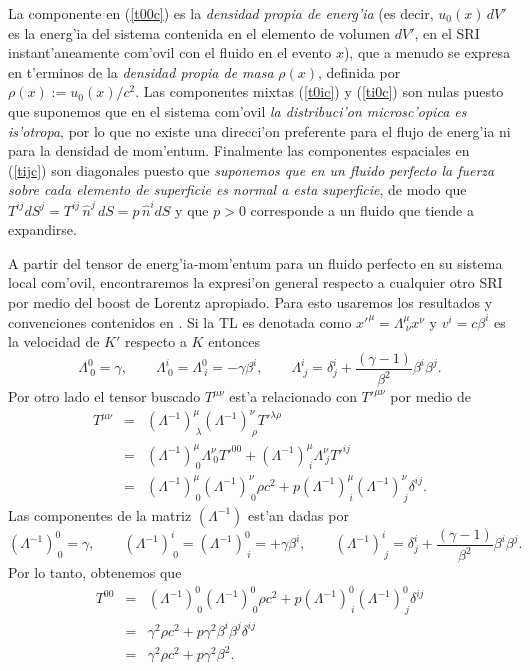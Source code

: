 La componente en (\ref{t00c}) es la \textit{densidad propia de energ'ia} (es decir, $u_0(x)\,dV'$ es la energ'ia del sistema contenida en el elemento de volumen $dV'$, en el SRI instant'aneamente com'ovil con el fluido en el evento $x$), que a menudo se expresa en t'erminos de la \textit{densidad propia de masa} $\rho(x)$, definida por $\rho(x):=u_0(x)/c^2$. Las componentes
mixtas (\ref{t0ic}) y (\ref{ti0c}) son nulas puesto que suponemos que en el sistema com'ovil \textit{la distribuci'on microsc'opica es is'otropa}, por lo que no existe una direcci'on preferente para el flujo de energ'ia ni para la densidad de mom'entum. Finalmente las componentes espaciales
en (\ref{tijc}) son diagonales puesto que \textit{suponemos que en un fluido
perfecto la fuerza sobre cada elemento de superficie es normal a esta
superficie}, de modo que $T^{ij}dS^j=T^{ij}\,\hat{n}^j\,dS=p\,\hat{n}^i dS$ y que $p>0$ corresponde a un fluido que tiende a expandirse.

A partir del tensor de energ'ia-mom'entum para un fluido perfecto en su sistema local com'ovil, encontraremos la expresi'on general respecto a cualquier
otro SRI por medio del boost de Lorentz apropiado. Para esto usaremos los resultados y convenciones contenidos en \cite{7}. Si la TL es denotada como $x'^\mu=\Lambda^\mu_{\ \nu}x^\nu$ y $v^i=c\beta^i$ es la velocidad de $K'$ respecto a $K$ entonces
\begin{equation}
 \Lambda^0_{\ 0}=\gamma, \qquad \Lambda^i_{\ 0}=\Lambda^0_{\ i}=-\gamma\beta^i, \qquad \Lambda^i_{\ j}=\delta^i_j
+\frac{(\gamma-1) }{\beta^2}\beta^i\beta^j .
\end{equation}
Por otro lado el tensor buscado $T^{\mu\nu}$ est'a relacionado con $T'^{\mu\nu}$ por medio de
\begin{eqnarray}
T^{\mu\nu}&=&(\Lambda^{-1})^\mu_{\ \lambda}(\Lambda^{-1})^\nu_{\ \rho}T'^{\lambda\rho}
\\
&=& (\Lambda^{-1})^\mu_{\ 0}\Lambda^\nu_{\ 0}T'^{00}+(\Lambda^{-1})^\mu_{\
i}\Lambda^\nu_{\ j}T'^{ij}\\
&=& (\Lambda^{-1})^\mu_{\ 0}(\Lambda^{-1})^\nu_{\ 0}\rho c^2+p(\Lambda^{-1})^\mu_{\
i}(\Lambda^{-1})^\nu_{\ j}\delta^{ij}.
\end{eqnarray}
Las componentes de la matriz $(\Lambda^{-1})$ est'an dadas por
\begin{equation}
(\Lambda^{-1})^0_{\ 0}=\gamma, \qquad (\Lambda^{-1})^i_{\ 0}=(\Lambda^{-1})^0_{\ i}=+\gamma\beta^i, \qquad (\Lambda^{-1})^i_{\ j}=\delta^i_j
+\frac{(\gamma-1) }{\beta^2}\beta^i\beta^j .
\end{equation}
Por lo tanto, obtenemos que
\begin{eqnarray}
T^{00}&=& (\Lambda^{-1})^0_{\ 0}(\Lambda^{-1})^0_{\ 0}\rho c^2+p(\Lambda^{-1})^0_{\ i}(\Lambda^{-1})^0_{\ j}\delta^{ij} \\
&=& \gamma^2\rho c^2+p\gamma^2\beta^i\beta^j\delta^{ij} \\
&=& \gamma^2\rho c^2+p\gamma^2\beta^2 .
\end{eqnarray}

